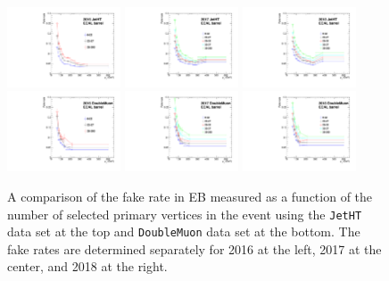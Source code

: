 \begin{figure}[!htbp]
\centering
\includegraphics[width=0.3\textwidth]{fig/compare_pv_EB_2016_jetht.pdf}
\includegraphics[width=0.3\textwidth]{fig/compare_pv_EB_2017_jetht.pdf}
\includegraphics[width=0.3\textwidth]{fig/compare_pv_EB_2018_jetht.pdf}\\
\includegraphics[width=0.3\textwidth]{fig/compare_pv_EB_2016_doublemuon.pdf}
\includegraphics[width=0.3\textwidth]{fig/compare_pv_EB_2017_doublemuon.pdf}
\includegraphics[width=0.3\textwidth]{fig/compare_pv_EB_2018_doublemuon.pdf}
\caption{A comparison of the fake rate in EB measured as a function of the number of selected primary vertices in the event using the \texttt{JetHT} data set at the top and \texttt{DoubleMuon} data set at the bottom. The fake rates are determined separately for 2016 at the left, 2017 at the center, and 2018 at the right.}
\label{fig:frpileup_EB}
\end{figure}

